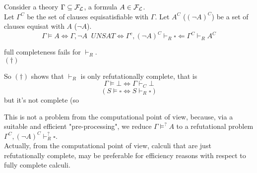 Consider a theory $\Gamma \subseteq \mathcal{F}_\mathcal{L}$, a formula $A \in \mathcal{F}_\mathcal{L}$.\\
Let $\Gamma^C$ be the set of clauses equisatisfiable with $\Gamma$. Let $A^C$ ($(\neg A)^C$) be a set of clauses equisat with $A$ ($\neg A$).\\

$$ \Gamma \models A \Leftrightarrow \Gamma, \neg A \;\; UNSAT \Leftrightarrow \Gamma^c, (\neg A)^C \vdash_R \square \Leftarrow \Gamma^C \vdash_R A^C$$

full completeness fails for $\vdash_R$.\\


$(\dag)$

So $(\dag)$ shows that $\vdash_R$ is only refutationally complete, that is 
$$ \Gamma \models \bot \Leftrightarrow \Gamma \vdash_C \bot $$
$$ (S \models \square \Leftrightarrow S \vdash_R \square) $$
but it's not complete (so $ $%

This is not a problem from the computational point of view, because, via a suitable and efficient "pre-processing", we reduce $\Gamma \models^? A$ to a refutational problem $\Gamma^C, (\neg A)^C \vdash_R^? \square$.\\

Actually, from the computational point of view, calculi that are just refutationally complete, may be preferable for efficiency reasons with respect to fully complete calculi.\\


